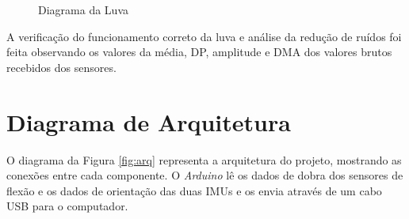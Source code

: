 \begin{figure}[H]
  \setlength{\abovecaptionskip}{0pt}
  \setlength{\belowcaptionskip}{0pt}
  \caption[Diagrama da Luva]{Diagrama da Luva}
  \centering
  \captionsetup{justification=centering}
  \label{fig:diagluva}
\end{figure}

A verificação do funcionamento correto da luva e análise da redução de ruídos foi feita observando os valores da média, \ac{DP}, amplitude e \ac{DMA} dos valores brutos recebidos dos sensores.

\section{Diagrama de Arquitetura}
\label{sec:arquitetura}
O diagrama da Figura \ref{fig:arq} representa a arquitetura do projeto, mostrando as conexões entre cada componente. O \textit{Arduino} lê os dados de dobra dos sensores de flexão e os dados de orientação das duas \ac{IMU}s e os envia através de um cabo \ac{USB} para o computador.

